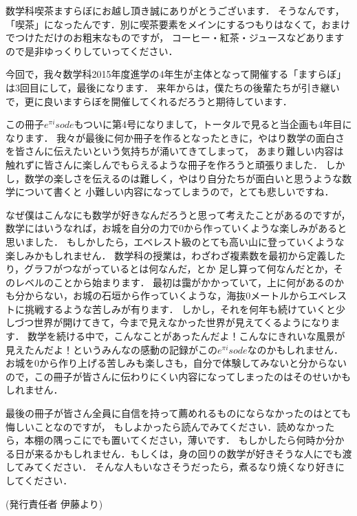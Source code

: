 数学科喫茶ますらぼにお越し頂き誠にありがとうございます．
そうなんです，「喫茶」になったんです．別に喫茶要素をメインにするつもりはなくて，おまけでつけただけのお粗末なものですが，
コーヒー・紅茶・ジュースなどありますので是非ゆっくりしていってください．

今回で，我々数学科2015年度進学の4年生が主体となって開催する「ますらぼ」は3回目にして，最後になります．
来年からは，僕たちの後輩たちが引き継いで，更に良いますらぼを開催してくれるだろうと期待しています．

この冊子$e^{\pi i}sode$もついに第4号になりまして，トータルで見ると当企画も4年目になります．
我々が最後に何か冊子を作るとなったときに，やはり数学の面白さを皆さんに伝えたいという気持ちが涌いてきてしまって，
あまり難しい内容は触れずに皆さんに楽しんでもらえるような冊子を作ろうと頑張りました．
しかし，数学の楽しさを伝えるのは難しく，やはり自分たちが面白いと思うような数学について書くと
小難しい内容になってしまうので，とても悲しいですね．

なぜ僕はこんなにも数学が好きなんだろうと思って考えたことがあるのですが，
数学にはいうなれば，お城を自分の力で$0$から作っていくような楽しみがあると思いました．
もしかしたら，エベレスト級のとても高い山に登っていくような楽しみかもしれません．
数学科の授業は，わざわざ複素数を最初から定義したり，グラフがつながっているとは何なんだ，とか
足し算って何なんだとか，そのレベルのことから始まります．
最初は靄がかかっていて，上に何があるのかも分からない，お城の石垣から作っていくような，海抜$0$メートルからエベレストに挑戦するような苦しみが有ります．
しかし，それを何年も続けていくと少しづつ世界が開けてきて，今まで見えなかった世界が見えてくるようになります．
数学を続ける中で，こんなことがあったんだよ！こんなにきれいな風景が見えたんだよ！というみんなの感動の記録がこの$e^{\pi i}sode$なのかもしれません．
お城を$0$から作り上げる苦しみも楽しさも，自分で体験してみないと分からないので，この冊子が皆さんに伝わりにくい内容になってしまったのはそのせいかもしれません．

最後の冊子が皆さん全員に自信を持って薦めれるものにならなかったのはとても悔しいことなのですが，
もしよかったら読んでみてください．読めなかったら，本棚の隅っこにでも置いてください，薄いです．
もしかしたら何時か分かる日が来るかもしれません．もしくは，身の回りの数学が好きそうな人にでも渡してみてください．
そんな人もいなさそうだったら，煮るなり焼くなり好きにしてください．

(発行責任者 伊藤より)
